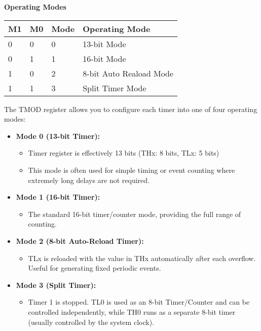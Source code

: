 \documentclass[
]{article}
\begin{document}
\textbf{Operating Modes}

\begin{longtable}[]{@{}llll@{}}
\toprule
M1 & M0 & Mode & Operating Mode \\
\midrule
\endhead
0 & 0 & 0 & 13-bit Mode \\
0 & 1 & 1 & 16-bit Mode \\
1 & 0 & 2 & 8-bit Auto Reaload Mode \\
1 & 1 & 3 & Split Timer Mode \\
\bottomrule
\end{longtable}

The TMOD register allows you to configure each timer into one of four
operating modes:

\begin{itemize}
\item
  \textbf{Mode 0 (13-bit Timer):}

  \begin{itemize}
  \item
    Timer register is effectively 13 bits (THx: 8 bits, TLx: 5 bits)
  \item
    This mode is often used for simple timing or event counting where
    extremely long delays are not required.
  \end{itemize}
\item
  \textbf{Mode 1 (16-bit Timer):}

  \begin{itemize}
  \item
    The standard 16-bit timer/counter mode, providing the full range of
    counting.
  \end{itemize}
\item
  \textbf{Mode 2 (8-bit Auto-Reload Timer):}

  \begin{itemize}
  \item
    TLx is reloaded with the value in THx automatically after each
    overflow. Useful for generating fixed periodic events.
  \end{itemize}
\item
  \textbf{Mode 3 (Split Timer):}

  \begin{itemize}
  \item
    Timer 1 is stopped. TL0 is used as an 8-bit Timer/Counter and can be
    controlled independently, while TH0 runs as a separate 8-bit timer
    (usually controlled by the system clock).
  \end{itemize}
\end{itemize}
\end{document}
